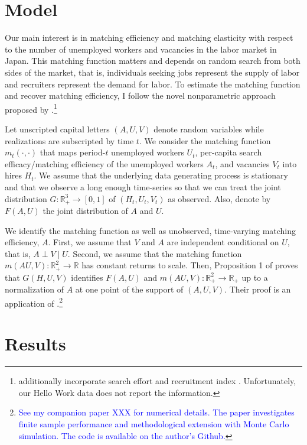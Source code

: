 \documentclass[12pt]{article}
\begin{document}
\section{Model}
Our main interest is in matching efficiency and matching elasticity with respect to the number of unemployed workers and vacancies in the labor market in Japan.
This matching function matters and depends on random search from both sides of the market, that is, individuals seeking jobs represent the supply of labor and recruiters represent the demand for labor.
To estimate the matching function and recover matching efficiency, I follow the novel nonparametric approach proposed by \cite{lange2020beyond}.\footnote{\cite{lange2020beyond} additionally incorporate search effort \citep{mukoyama2018job} and recruitment index \citep{davis2013establishment}. Unfortunately, our Hello Work data does not report the information.}

Let unscripted capital letters $(A, U, V)$ denote random variables while realizations are subscripted by time $t$. 
We consider the matching function $m_t(\cdot,\cdot)$ that maps period-$t$ unemployed workers $U_t$, per-capita search efficacy/matching efficiency of the unemployed workers $A_t$, and vacancies $V_t$ into hires $H_t$.
We assume that the underlying data generating process is stationary and that we observe a long enough time-series so that we can treat the joint distribution $G: \mathbb{R}_{+}^3 \rightarrow[0,1]$ of $\left(H_t, U_t, V_t\right)$ as observed. 
Also, denote by $F(A, U)$ the joint distribution of $A$ and $U$.

We identify the matching function as well as unobserved, time-varying matching efficiency, $A .$ 
First, we assume that $V$ and $A$ are independent conditional on $U$, that is, $A \perp V \mid U$. 
Second, we assume that the matching function $m(AU,V):\mathbb{R}_{+}^2 \rightarrow \mathbb{R}$ has constant returns to scale. 
Then, Proposition 1 of \cite{lange2020beyond} proves that $G(H, U, V)$ identifies $F(A, U)$ and $m(A U, V): \mathbb{R}_{+}^2 \rightarrow \mathbb{R}_{+}$ up to a normalization of $A$ at one point of the support of $(A, U, V)$. Their proof is an application of \cite{matzkin2003nonparametric}.\footnote{\textcolor{blue}{See my companion paper XXX for numerical details. The paper investigates finite sample performance and methodological extension with Monte Carlo simulation. The code is available on the author's Github.}}



\section{Results}
\end{document}
